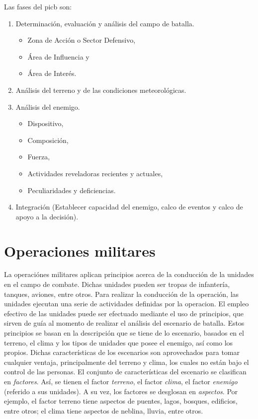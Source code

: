 Las fases del \gls{picb} son: 

\begin{enumerate}
\item Determinación, evaluación y análisis del campo de batalla.
  \begin{itemize}
  \item Zona de Acción o Sector Defensivo,
  \item Área de Influencia y
  \item Área de Interés.
  \end{itemize}

\item Análisis del terreno  y de las  condiciones meteorológicas.

\item Análisis del enemigo.
  \begin{itemize}
  \item Dispositivo,
  \item Composición,
  \item Fuerza,
  \item Actividades reveladoras recientes y actuales,
  \item Peculiaridades y deficiencias.
  \end{itemize}

\item Integración (Establecer capacidad del enemigo, calco de eventos y calco de apoyo a la decisión).
\end{enumerate}



\section{Operaciones militares}

La operaciónes militares aplican principios acerca de la conducción de la unidades en el campo de combate. Dichas unidades pueden ser tropas de infantería, tanques, aviones, entre otros. Para realizar la conducción de la operación, las unidades ejecutan una serie de actividades definidas por la \gls{operacion}. El empleo efectivo de las unidades puede ser efectuado mediante el uso de principios, que sirven de guía al momento de realizar el análisis del \gls{escenario} de batalla. Estos principios se basan en la descripción que se tiene de lo escenario, basados en el terreno, el clima y los tipos de unidades que posee el enemigo, así como los propios. Dichas características de los \glspl{escenario} son aprovechados para tomar cualquier ventaja, principalmente del terreno y clima, los cuales no están bajo el control de las personas.
El conjunto de características del escenario se clasifican en \emph{factores}. Así, se tienen el factor \emph{terreno}, el factor \emph{clima}, el factor \emph{enemigo} (referido a sus unidades). A su vez, los factores se desglosan en \emph{aspectos}. Por ejemplo, el factor terreno tiene aspectos de puentes, lagos, bosques, edificios, entre otros; el clima tiene aspectos de neblina, lluvia, entre otros.

